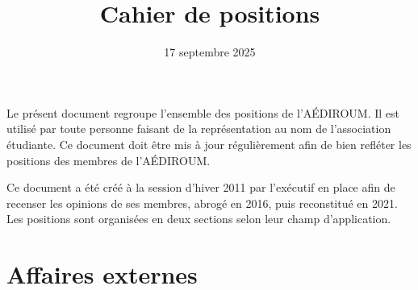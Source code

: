 \documentclass{aediroum}
\title{Cahier de positions}
\date{17 septembre 2025}
\begin{document}
\maketitle

Le présent document regroupe l'ensemble des positions de l'AÉDIROUM. Il est utilisé par toute personne faisant de la représentation au nom de l'association étudiante. Ce document doit être mis à jour régulièrement afin de bien refléter les positions des membres de l'AÉDIROUM.

Ce document a été créé à la session d'hiver 2011 par l'exécutif en place afin de recenser les opinions de ses membres, abrogé en 2016, puis reconstitué en 2021. Les positions sont organisées en deux sections selon leur champ d'application.

\section{Affaires externes}\label{sec:affaires-externes}
\end{document}
